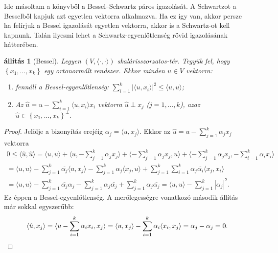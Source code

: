 \documentclass[article]{memoir}
\theoremstyle{plain}
\newtheorem{proposition}{állítás}[chapter]
\newcommand{\ip}[2]{\langle#1,#2\rangle}
\begin{document}
Ide másoltam a könyvből a Bessel--Schwartz páros igazolását.
A Schwartzot a Besselből kapjuk azt egyetlen vektorra alkalmazva.
Ha ez így van, akkor persze ha felírjuk a Bessel igazolását egyetlen vektorra, akkor is a Schwartz-ot kell kapnunk.
Talán ilyesmi lehet a Schwartz-egyenlőtlenség rövid igazolásának hátterében.

\begin{proposition}[Bessel]\label{pr:Bessel}
	Legyen $\left( V,\ip{\cdot}{\cdot} \right)$ skalárisszorzatos-tér.
	Tegyük fel, hogy $\left\{ x_1,\ldots,x_k \right\}$ egy ortonormált rendszer.
	Ekkor minden $u\in V$ vektorra:
	\begin{enumerate}
		\item
		      fennáll a  \emph{Bessel-egyenlőtlenség:}
		      $\sum_{i=1}^k|\ip{u}{x_i}|^2\leq\ip{u}{u}$;
		\item
		      Az
		      \(
		      \hat{u}=u-\sum_{i=1}^k\ip{u}{x_i}x_i
		      \)
		      vektorra $\hat{u}\perp x_j$
		      ($j=1,\ldots,k$), azaz
		      \(
		      \hat{u}\in
		      \left\{ x_1,\ldots,x_k \right\}^\perp
		      .
		      \)
		      \qedhere
	\end{enumerate}
\end{proposition}
\begin{proof}
	Jelölje a bizonyítás erejéig
	\begin{math}
		\alpha_j=\ip{u}{x_j}.
	\end{math}
	Ekkor az $\hat{u}=u-\sum_{j=1}^k\alpha_jx_j$ vektorra
	\begin{multline*}
		0
		\leq
		\ip{\hat{u}}{\hat{u}}
		=
		\ip{u}{u}+\ip{u}{-\sum_{j=1}^k\alpha_jx_j}+\ip{-\sum_{j=1}^k\alpha_jx_j}{u}+\ip{-\sum_{j=1}^k\alpha_jx_j}{-\sum_{i=1}^k\alpha_ix_i}
		\\
		=
		\ip{u}{u}-\sum_{j=1}^k\overline{\alpha_j}\ip{u}{x_j}-\sum_{j=1}^k\alpha_j\ip{x_j}{u}+\sum_{j=1}^k\sum_{i=1}^k\alpha_j\overline{\alpha_i}\ip{x_j}{x_i}
		\\
		=
		\ip{u}{u}-\sum_{j=1}^k\overline{\alpha_j}\alpha_j-\sum_{j=1}^k\alpha_j\overline{\alpha_j}+\sum_{j=1}^k\alpha_j\overline{\alpha_j}
		=\ip{u}{u}-\sum_{j=1}^k|\alpha_j|^2.
	\end{multline*}
	Ez éppen a Bessel-egyenlőtlenség.
	A merőlegességre vonatkozó második állítás már sokkal egyszerűbb:
	\[
		\ip{\hat{u}}{x_j}
		=
		\ip{u-\sum_{i=1}^k\alpha_ix_i}{x_j}
		=
		\ip{u}{x_j}-\sum_{i=1}^k\alpha_i\ip{x_i}{x_j}
		=
		\alpha_j-\alpha_j
		=
		0.
		\qedhere
	\]
\end{proof}
\end{document}
